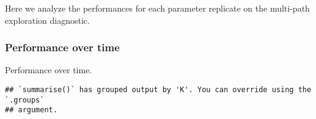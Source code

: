 \documentclass[]{book}
\newenvironment{Shaded}{\begin{snugshade}}{\end{snugshade}}
\newcommand{\DataTypeTok}[1]{\textcolor[rgb]{0.13,0.29,0.53}{#1}}
\newcommand{\KeywordTok}[1]{\textcolor[rgb]{0.13,0.29,0.53}{\textbf{#1}}}
\newcommand{\NormalTok}[1]{#1}
\newcommand{\OperatorTok}[1]{\textcolor[rgb]{0.81,0.36,0.00}{\textbf{#1}}}
\newcommand{\StringTok}[1]{\textcolor[rgb]{0.31,0.60,0.02}{#1}}
\begin{document}
Here we analyze the performances for each parameter replicate on the multi-path exploration diagnostic.

\hypertarget{performance-over-time-19}{%
\subsubsection{Performance over time}\label{performance-over-time-19}}

Performance over time.

\begin{Shaded}
\end{Shaded}

\begin{verbatim}
## `summarise()` has grouped output by 'K'. You can override using the `.groups`
## argument.
\end{verbatim}
\end{document}
